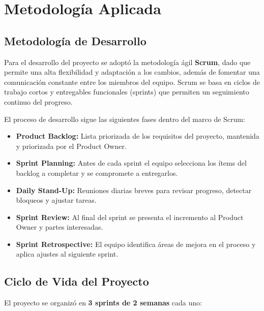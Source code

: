\chapter{Metodología Aplicada}

\section{Metodología de Desarrollo}

Para el desarrollo del proyecto se adoptó la metodología ágil \textbf{Scrum},
dado que permite una alta flexibilidad y adaptación a los cambios, además de
fomentar una comunicación constante entre los miembros del equipo. Scrum se
basa en ciclos de trabajo cortos y entregables funcionales (sprints) que
permiten un seguimiento continuo del progreso.

El proceso de desarrollo sigue las siguientes fases dentro del marco de Scrum:

\begin{itemize}[leftmargin=1.5em]
  \item \textbf{Product Backlog:} Lista priorizada de los requisitos del
        proyecto, mantenida y priorizada por el Product Owner.
  \item \textbf{Sprint Planning:} Antes de cada sprint el equipo selecciona
        los ítems del backlog a completar y se compromete a entregarlos.
  \item \textbf{Daily Stand-Up:} Reuniones diarias breves para revisar
        progreso, detectar bloqueos y ajustar tareas.
  \item \textbf{Sprint Review:} Al final del sprint se presenta el incremento
        al Product Owner y partes interesadas.
  \item \textbf{Sprint Retrospective:} El equipo identifica áreas de mejora
        en el proceso y aplica ajustes al siguiente sprint.
\end{itemize}

\section{Ciclo de Vida del Proyecto}

El proyecto se organizó en \textbf{3 sprints de 2 semanas} cada uno:

